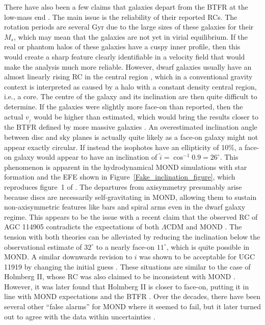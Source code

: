 \documentclass[fleqn,usenatbib,useAMS]{mnras} %
\begin{document}
There have also been a few claims that galaxies depart from the BTFR at the low-mass end \citep[e.g.][]{Mancera_2019, Mancera_2020}. The main issue is the reliability of their reported RCs. The rotation periods are several Gyr due to the large sizes of these galaxies for their $M_s$, which may mean that the galaxies are not yet in virial equilibrium. If the real or phantom halos of these galaxies have a cuspy inner profile, then this would create a sharp feature clearly identifiable in a velocity field that would make the analysis much more reliable. However, dwarf galaxies usually have an almost linearly rising RC in the central region \citep[e.g.][]{Neil_2000}, which in a conventional gravity context is interpreted as caused by a halo with a constant density central region, i.e., a core. The centre of the galaxy and its inclination are then quite difficult to determine. If the galaxies were slightly more face-on than reported, then the actual $v_{_f}$ would be higher than estimated, which would bring the results closer to the BTFR defined by more massive galaxies \citep[see figure~9 of][]{Mancera_2020}. An overestimated inclination angle between disc and sky planes is actually quite likely as a face-on galaxy might not appear exactly circular. If instead the isophotes have an ellipticity of 10\%, a face-on galaxy would appear to have an inclination of $\widetilde{i} = \cos^{-1} 0.9 = 26^\circ$. This phenomenon is apparent in the hydrodynamical MOND simulations with star formation and the EFE shown in Figure~\ref{Fake_inclination_figure}, which reproduces figure~1 of \citet{Banik_2022_fake_inclination}. The departures from axisymmetry presumably arise because discs are necessarily self-gravitating in MOND, allowing them to sustain non-axisymmetric features like bars and spiral arms even in the dwarf galaxy regime. This appears to be the issue with a recent claim that the observed RC of AGC 114905 contradicts the expectations of both $\Lambda$CDM and MOND \citep{Mancera_2022}. The tension with both theories can be alleviated by reducing the inclination below the observational estimate of $32^\circ$ to a nearly face-on $11^\circ$, which is quite possible in MOND. A similar downwards revision to $i$ was shown to be acceptable for UGC 11919 by changing the initial guess \citep{Saburova_2015}. These situations are similar to the case of Holmberg II, whose RC was also claimed to be inconsistent with MOND \citep{Oh_2011}. However, it was later found that Holmberg II is closer to face-on, putting it in line with MOND expectations and the BTFR \citep{Gentile_2012}. Over the decades, there have been several other ``false alarms'' for MOND where it seemed to fail, but it later turned out to agree with the data within uncertainties \citep[e.g.][and references therein]{Famaey_2013}.
\end{document}
